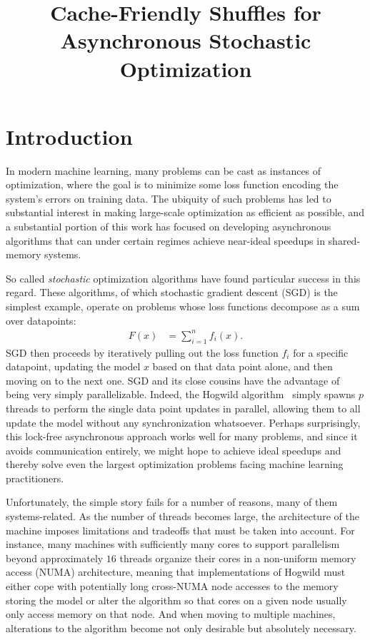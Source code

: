 \documentclass[times,11pt]{article}
\numberwithin{equation}{section}		%
\numberwithin{figure}{section}			%
\numberwithin{table}{section}				%
\begin{document}
\title{Cache-Friendly Shuffles for Asynchronous Stochastic Optimization}

\maketitle
\section{Introduction}

In modern machine learning, many problems can be cast as instances of optimization, where the goal is to minimize some loss
function encoding the system's errors on training data. The ubiquity of such problems has led to substantial interest in making large-scale
optimization as efficient as possible, and a substantial portion of this work has focused on developing asynchronous algorithms that can under certain regimes
achieve near-ideal speedups in shared-memory systems.

So called {\it stochastic} optimization algorithms have found particular success in this regard. These algorithms, of which stochastic gradient descent (SGD) is the simplest example, operate
on problems whose loss functions decompose as a sum over datapoints:
\begin{align*}
F\left(x\right) & = \sum_{i = 1}^{n} f_{i}\left(x\right) .
\end{align*}
SGD then proceeds by iteratively pulling out the loss function $f_{i}$ for a specific datapoint, updating the model $x$ based on that data point alone, and then moving on to the next one.
SGD and its close cousins have the advantage of being very simply parallelizable. Indeed, the Hogwild algorithm~\citep{} simply spawns $p$ threads to perform the single data point updates in parallel,
allowing them to all update the model without any synchronization whatsoever. Perhaps surprisingly, this lock-free asynchronous approach works well for many problems, and since it avoids communication entirely,
we might hope to achieve ideal speedups and thereby solve even the largest optimization problems facing machine learning practitioners.


Unfortunately, the simple story fails for a number of reasons, many of them systems-related. As the number of threads becomes large, the architecture of the machine
imposes limitations and tradeoffs that must be taken into account. For instance, many machines with sufficiently many cores to support parallelism beyond approximately $16$
threads organize their cores in a non-uniform memory access (NUMA) architecture, meaning that implementations of Hogwild must either cope with potentially long cross-NUMA node
accesses to the memory storing the model or alter the algorithm so that cores on a given node usually only access memory on that node. And when moving to multiple machines,
alterations to the algorithm become not only desirable but absolutely necessary.
\end{document}
